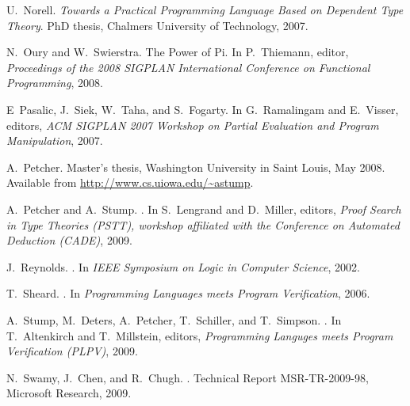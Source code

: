 \documentclass[9pt,natbib]{sigplanconf}
\begin{document}
\begin{thebibliography}{18}
U.~Norell.
\newblock \emph{{Towards a Practical Programming Language Based on Dependent
  Type Theory}}.
\newblock PhD thesis, {Chalmers University of Technology}, 2007.

N.~Oury and W.~Swierstra.
\newblock The {Power} of {Pi}.
\newblock In P.~Thiemann, editor, \emph{Proceedings of the 2008 SIGPLAN
  International Conference on Functional Programming}, 2008.

E~Pasalic, J.~Siek, W.~Taha, and S.~Fogarty.
\newblock In G.~Ramalingam and E.~Visser, editors, \emph{ACM SIGPLAN 2007
  Workshop on Partial Evaluation and Program Manipulation}, 2007.

A.~Petcher.
\newblock Master's thesis, {Washington University in Saint Louis}, May 2008.
\newblock Available from \url{http://www.cs.uiowa.edu/~astump}.

A.~Petcher and A.~Stump.
.
\newblock In S.~Lengrand and D.~Miller, editors, \emph{Proof Search in Type
  Theories (PSTT), workshop affiliated with the Conference on Automated
  Deduction (CADE)}, 2009.

J.~Reynolds.
.
\newblock In \emph{IEEE Symposium on Logic in Computer Science}, 2002.

T.~Sheard.
.
\newblock In \emph{Programming Languages meets Program Verification}, 2006.

A.~Stump, M.~Deters, A.~Petcher, T.~Schiller, and T.~Simpson.
.
\newblock In T.~Altenkirch and T.~Millstein, editors, \emph{Programming
  Languges meets Program Verification (PLPV)}, 2009.

N.~Swamy, J.~Chen, and R.~Chugh.
.
\newblock Technical Report MSR-TR-2009-98, Microsoft Research, 2009.


\end{thebibliography}
\end{document}
